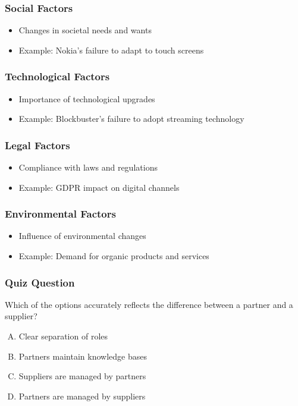 \documentclass[aspectratio=169, table]{beamer}
\begin{document}
\begin{frame}
	\frametitle{Social Factors}
	\begin{itemize}
		\item Changes in societal needs and wants
		\item Example: Nokia’s failure to adapt to touch screens
	\end{itemize}
\end{frame}

\begin{frame}
	\frametitle{Technological Factors}
	\begin{itemize}
		\item Importance of technological upgrades
		\item Example: Blockbuster’s failure to adopt streaming technology
	\end{itemize}
\end{frame}

\begin{frame}
	\frametitle{Legal Factors}
	\begin{itemize}
		\item Compliance with laws and regulations
		\item Example: GDPR impact on digital channels
	\end{itemize}
\end{frame}

\begin{frame}
	\frametitle{Environmental Factors}
	\begin{itemize}
		\item Influence of environmental changes
		\item Example: Demand for organic products and services
	\end{itemize}
\end{frame}

\begin{frame}
	\frametitle{Quiz Question}
	Which of the options accurately reflects the difference between a partner and a supplier?
	
	\begin{enumerate}[A.]
		\item Clear separation of roles
		\item Partners maintain knowledge bases
		\item Suppliers are managed by partners
		\item Partners are managed by suppliers
	\end{enumerate}
\end{frame}
\end{document}
